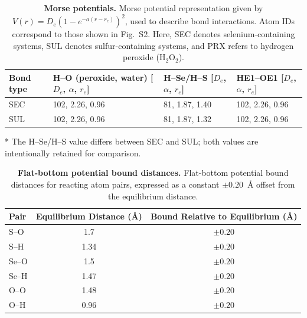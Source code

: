 \begin{table}[H]
\centering
\caption[\textbf{Morse Potentials}]{\textbf{Morse potentials.} {\normalfont
Morse potential representation given by $V(r) = D_e\left(1 - e^{-a(r-r_e)}\right)^2$,
used to describe bond interactions. Atom IDs correspond to those shown in Fig.~S2.
Here, SEC denotes selenium-containing systems, SUL denotes sulfur-containing systems,
and PRX refers to hydrogen peroxide ($\mathrm{H_2O_2}$).}}
\begin{threeparttable}
\begin{tabularx}{\textwidth}{lXXX}
\toprule
\textbf{Bond type} &
\makecell{\textbf{H--O (peroxide,} \\ \textbf{water) [$D_e$, $\alpha$, $r_e$]}} &
\makecell{\textbf{H--Se/H--S} \\ \textbf{[$D_e$, $\alpha$, $r_e$]}} &
\makecell{\textbf{HE1--OE1} \\ \textbf{[$D_e$, $\alpha$, $r_e$]}} \\
\midrule
SEC & 102, 2.26, 0.96 & 81, 1.87, 1.40\tnote{*} & 102, 2.26, 0.96 \\
SUL & 102, 2.26, 0.96 & 81, 1.87, 1.32\tnote{*} & 102, 2.26, 0.96 \\
\bottomrule
\end{tabularx}
\begin{tablenotes}
\item[*] The H--Se/H--S value differs between SEC and SUL; both values are intentionally retained for comparison.
\end{tablenotes}
\end{threeparttable}
\end{table}

\begin{table}[H]
\centering
\small
\caption[Flat-bottom potential bound distances]{\textbf{Flat-bottom potential bound distances.} {\normalfont Flat-bottom potential bound distances for reacting atom pairs, expressed as a constant $\pm 0.20$~\si{\angstrom} offset from the equilibrium distance.}}
\label{tab:flatbottom}
\begin{tabular}{lcc}
\toprule
\textbf{Pair} & \textbf{Equilibrium Distance (\si{\angstrom})} & \textbf{Bound Relative to Equilibrium (\si{\angstrom})} \\
\midrule
S--O  & 1.7  & $\pm 0.20$ \\
S--H  & 1.34 & $\pm 0.20$ \\
Se--O & 1.5  & $\pm 0.20$ \\
Se--H & 1.47 & $\pm 0.20$ \\
O--O  & 1.48 & $\pm 0.20$ \\
O--H  & 0.96 & $\pm 0.20$ \\
\bottomrule
\end{tabular}
\end{table}

